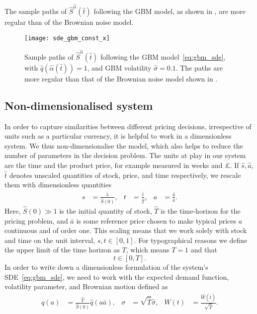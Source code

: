 \documentclass[main.tex]{subfiles}
\begin{document}
The sample paths of $\hat{S}^{\hat{\alpha}}(\hat{t})$ following the GBM model, as shown in
, are more regular
than of the Brownian noise model.
\begin{figure}[ht]
  \centering
  \texttt{[image: sde\_gbm\_const\_x]}
  \caption[Sample paths of stock following the GBM model]{Sample paths of $\hat{S}^{\hat{\alpha}}(\hat{t})$ following the GBM
    model~\eqref{eq:gbm_sde}, with $\hat{q}(\hat{\alpha}(\hat{t}))=1$, and GBM volatility
    $\hat{\sigma} = 0.1$. The paths are  more regular than that of the
    Brownian noise model shown in .
  }\label{fig:sde_gbm_const_x}
\end{figure}

\subsection{Non-dimensionalised system}\label{subsec:nondimensionalisation}
In order to capture similarities between different pricing decisions, irrespective of units
such as a particular currency, it is helpful to work in a dimensionless system.
We thus non-dimensionalise the model, which also helps to reduce the
number of parameters in the decision problem.
The units at play in our system are the time and the product price,
for example measured in weeks and \pounds.
If $\hat{s},\hat{a}$, $\hat{t}$ denotes unscaled quantities of stock, price, and
time respectively, we rescale them with dimensionless quantities
\begin{align}
  s&=\frac{\hat{s}}{\hat{S}(0)},&t &=\frac{\hat{t}}{\hat{T}},
  &a &= \frac{\hat{a}}{\bar{a}}.
\end{align}
Here, $\hat{S}(0)\gg 1$ is the initial quantity of stock, $\hat{T}$ is the time-horizon
for the pricing problem, and $\bar{a}$ is some reference price chosen
to make typical prices $a$ continuous and of order one.
This scaling means that we work solely with stock and time on the unit
interval, $s,t\in[0,1]$.
For typographical reasons we define the upper limit of the time
horizon as $T$, which means $T=1$ and that
\begin{equation}
  t\in[0,T].
\end{equation}
In order to write down a dimensionless formulation of the system's
SDE~\eqref{eq:gbm_sde}, we need to work with the expected demand
function, volatility parameter, and Brownian motion defined as
\begin{align}
  q(a)&=\frac{\hat{T}}{\hat{S}(0)}\hat{q}(a \bar{a}),
  &\sigma &= \sqrt{\hat{T}}\hat{\sigma},
  &W(t) &= \frac{\hat{W}(\hat{t})}{ \sqrt{\hat{T}}}.
\end{align}
\end{document}
